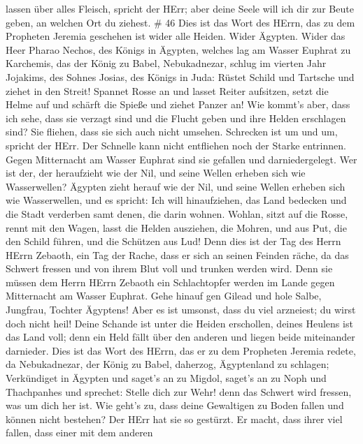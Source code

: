 lassen über alles Fleisch, spricht der HErr; aber deine Seele will ich
dir zur Beute geben, an welchen Ort du ziehest. \# 46  Dies
ist das Wort des HErrn, das zu dem Propheten Jeremia geschehen ist wider
alle Heiden.  Wider Ägypten. Wider das Heer Pharao Nechos,
des Königs in Ägypten, welches lag am Wasser Euphrat zu Karchemis, das
der König zu Babel, Nebukadnezar, schlug im vierten Jahr Jojakims, des
Sohnes Josias, des Königs in Juda:  Rüstet Schild und
Tartsche und ziehet in den Streit!  Spannet Rosse an und
lasset Reiter aufsitzen, setzt die Helme auf und schärft die Spieße und
ziehet Panzer an!  Wie kommt's aber, dass ich sehe, dass sie
verzagt sind und die Flucht geben und ihre Helden erschlagen sind? Sie
fliehen, dass sie sich auch nicht umsehen. Schrecken ist um und um,
spricht der HErr.  Der Schnelle kann nicht entfliehen noch
der Starke entrinnen. Gegen Mitternacht am Wasser Euphrat sind sie
gefallen und darniedergelegt.  Wer ist der, der heraufzieht
wie der Nil, und seine Wellen erheben sich wie Wasserwellen?
 Ägypten zieht herauf wie der Nil, und seine Wellen erheben
sich wie Wasserwellen, und es spricht: Ich will hinaufziehen, das Land
bedecken und die Stadt verderben samt denen, die darin wohnen.
 Wohlan, sitzt auf die Rosse, rennt mit den Wagen, lasst die
Helden ausziehen, die Mohren, und aus Put, die den Schild führen, und
die Schützen aus Lud!  Denn dies ist der Tag des Herrn
HErrn Zebaoth, ein Tag der Rache, dass er sich an seinen Feinden räche,
da das Schwert fressen und von ihrem Blut voll und trunken werden wird.
Denn sie müssen dem Herrn HErrn Zebaoth ein Schlachtopfer werden im
Lande gegen Mitternacht am Wasser Euphrat.  Gehe hinauf gen
Gilead und hole Salbe, Jungfrau, Tochter Ägyptens! Aber es ist umsonst,
dass du viel arzneiest; du wirst doch nicht heil!  Deine
Schande ist unter die Heiden erschollen, deines Heulens ist das Land
voll; denn ein Held fällt über den anderen und liegen beide miteinander
darnieder.  Dies ist das Wort des HErrn, das er zu dem
Propheten Jeremia redete, da Nebukadnezar, der König zu Babel, daherzog,
Ägyptenland zu schlagen;  Verkündiget in Ägypten und
saget's an zu Migdol, saget's an zu Noph und Thachpanhes und sprechet:
Stelle dich zur Wehr! denn das Schwert wird fressen, was um dich her
ist.  Wie geht's zu, dass deine Gewaltigen zu Boden fallen
und können nicht bestehen? Der HErr hat sie so gestürzt. 
Er macht, dass ihrer viel fallen, dass einer mit dem anderen
